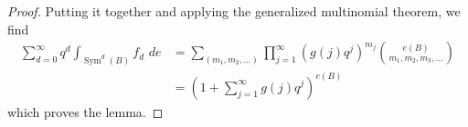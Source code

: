 \documentclass{amsart}
\theoremstyle{definition}
\newcommand{\Sym}{\operatorname{Sym}}
\begin{document}
\begin{proof}
Putting it together and applying the generalized multinomial theorem,
we find
\begin{align*}
\sum _{d=0}^{\infty } q^d \int _{\Sym ^{d} (B)}f_{d}\,\,de & = \sum _{(m_{1},m_{2},\dots )} \prod _{j=1}^{\infty } \left(g (j) q^{j} \right)^{m_{j}} \binom{e (B)}{m_{1},m_{2},m_{3},\dots }\\
&=\left(1+\sum _{j=1}^{\infty }g (j) q^{j} \right)^{e (B)}
\end{align*}
which proves the lemma.   
\end{proof}







   
\end{document}

